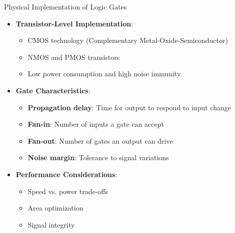 \documentclass[aspectratio=169,11pt]{beamer}
\newcommand{\concept}[1]{\textbf{\color{accentcolor}#1}}
\begin{document}
\begin{frame}{Physical Implementation of Logic Gates}
\begin{itemize}
\item \concept{Transistor-Level Implementation}:
\begin{itemize}
\item CMOS technology (Complementary Metal-Oxide-Semiconductor)
\item NMOS and PMOS transistors
\item Low power consumption and high noise immunity
\end{itemize}
\vspace{0.5cm}
\item \concept{Gate Characteristics}:
\begin{itemize}
\item \textbf{Propagation delay}: Time for output to respond to input change
\item \textbf{Fan-in}: Number of inputs a gate can accept
\item \textbf{Fan-out}: Number of gates an output can drive
\item \textbf{Noise margin}: Tolerance to signal variations
\end{itemize}
\vspace{0.3cm}
\item \concept{Performance Considerations}:
\begin{itemize}
\item Speed vs. power trade-offs
\item Area optimization
\item Signal integrity
\end{itemize}
\end{itemize}
\end{frame}
\end{document}

